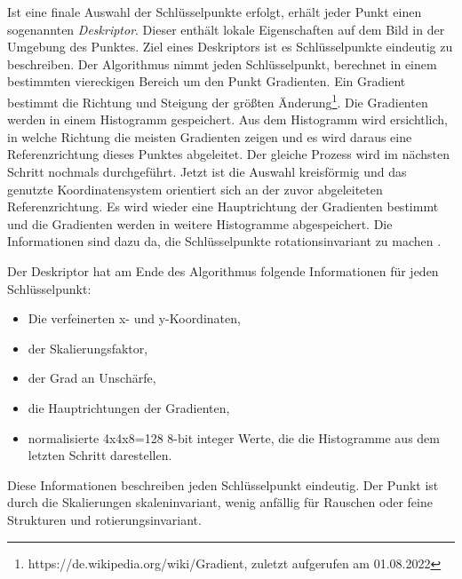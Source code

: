 Ist eine finale Auswahl der Schlüsselpunkte erfolgt, erhält jeder Punkt einen sogenannten \textit{Deskriptor}. Dieser enthält lokale Eigenschaften auf dem Bild in der Umgebung des Punktes. Ziel eines Deskriptors ist es Schlüsselpunkte eindeutig zu beschreiben. Der Algorithmus nimmt jeden Schlüsselpunkt, berechnet in einem bestimmten viereckigen Bereich um den Punkt Gradienten. Ein Gradient bestimmt die Richtung und Steigung der größten Änderung\footnote{https://de.wikipedia.org/wiki/Gradient, zuletzt aufgerufen am 01.08.2022}. Die Gradienten werden in einem Histogramm gespeichert. Aus dem Histogramm wird ersichtlich, in welche Richtung die meisten Gradienten zeigen und es wird daraus eine Referenzrichtung dieses Punktes abgeleitet. Der gleiche Prozess wird im nächsten Schritt nochmals durchgeführt. Jetzt ist die Auswahl kreisförmig und das genutzte Koordinatensystem orientiert sich an der zuvor abgeleiteten Referenzrichtung. Es wird wieder eine Hauptrichtung der Gradienten bestimmt und die Gradienten werden in weitere Histogramme abgespeichert. Die Informationen sind dazu da, die Schlüsselpunkte rotationsinvariant zu machen \cite*[Herling und Broll(2011),][]{herling2011} \cite*[Weitz(2022),][]{weitz2022}. 

Der Deskriptor hat am Ende des Algorithmus folgende Informationen für jeden Schlüsselpunkt:

\begin{itemize}
    \item Die verfeinerten x- und y-Koordinaten,
    \item der Skalierungsfaktor,
    \item der Grad an Unschärfe,
    \item die Hauptrichtungen der Gradienten,
    \item normalisierte 4x4x8=128 8-bit integer Werte, die die Histogramme aus dem letzten Schritt darestellen.
\end{itemize}

Diese Informationen beschreiben jeden Schlüsselpunkt eindeutig. Der Punkt ist durch die Skalierungen skaleninvariant, wenig anfällig für Rauschen oder feine Strukturen und rotierungsinvariant.

